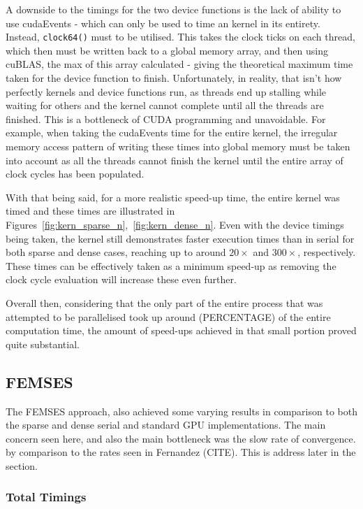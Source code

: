 A downside to the timings for the two device functions is the lack of ability to use cudaEvents - which can only be used to time an kernel in its entirety. Instead, \texttt{clock64()} must to be utilised. This takes the clock ticks on each thread, which then must be written back to a global memory array, and then using cuBLAS, the max of this array calculated - giving the theoretical maximum time taken for the device function to finish. Unfortunately, in reality, that isn't how perfectly kernels and device functions run, as threads end up stalling while waiting for others and the kernel cannot complete until all the threads are finished. This is a bottleneck of CUDA programming and unavoidable. For example, when taking the cudaEvents time for the entire kernel, the irregular memory access pattern of writing these times into global memory must be taken into account as all the threads cannot finish the kernel until the entire array of clock cycles has been populated.

With that being said, for a more realistic speed-up time, the entire kernel was timed and these times are illustrated in Figures~\ref{fig:kern_sparse_n},~\ref{fig:kern_dense_n}. Even with the device timings being taken, the kernel still demonstrates faster execution times than in serial for both sparse and dense cases, reaching up to around $20\times$ and $300\times$, respectively. These times can be effectively taken as a minimum speed-up as removing the clock cycle evaluation will increase these even further.

Overall then, considering that the only part of the entire process that was attempted to be parallelised took up around (PERCENTAGE) of the entire computation time, the amount of speed-ups achieved in that small portion proved quite substantial.

\subsection{FEMSES}

The FEMSES approach, also achieved some varying results in comparison to both the sparse and dense serial and standard GPU implementations. The main concern seen here, and also the main bottleneck was the slow rate of convergence. by comparison to the rates seen in Fernandez (CITE). This is address later in the section.

\subsubsection{Total Timings}

